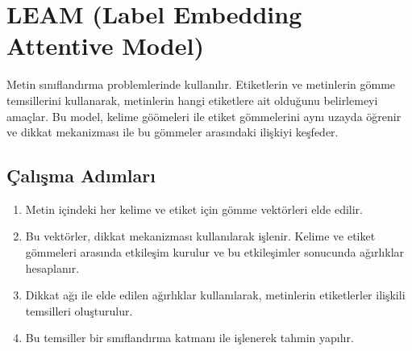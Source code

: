 \section{LEAM (Label Embedding Attentive Model)}
Metin sınıflandırma problemlerinde kullanılır. Etiketlerin ve metinlerin gömme temsillerini kullanarak, metinlerin hangi etiketlere ait olduğunu belirlemeyi amaçlar. Bu model, kelime göömeleri ile etiket gömmelerini aynı uzayda öğrenir ve dikkat mekanizması ile bu gömmeler arasındaki ilişkiyi keşfeder. 

\subsection{Çalışma Adımları}

\begin{enumerate}
	\item Metin içindeki her kelime ve etiket için gömme vektörleri elde edilir.
	\item Bu vektörler, dikkat mekanizması kullanılarak işlenir. Kelime ve etiket gömmeleri arasında etkileşim kurulur ve bu etkileşimler sonucunda ağırlıklar hesaplanır.
	\item Dikkat ağı ile elde edilen ağırlıklar kullanılarak, metinlerin etiketlerler ilişkili temsilleri oluşturulur.
	\item Bu temsiller bir sınıflandırma katmanı ile işlenerek tahmin yapılır.
\end{enumerate}

\newpage